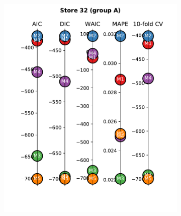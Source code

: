 \documentclass[english, 12pt, a4paper, sci, utf8, a-1b, online]{aaltothesis}
\begin{document}
\begin{abstractpage}[english]
\begin{figure}[hbt]
\begin{subfigure}[htb]{0.3\textwidth}
		\includegraphics[width=\textwidth]{../plots/metrics/metrics_plot_single_store_32_of_A.pdf}
	\end{subfigure}
	

\end{figure}
\end{abstractpage}
\end{document}
